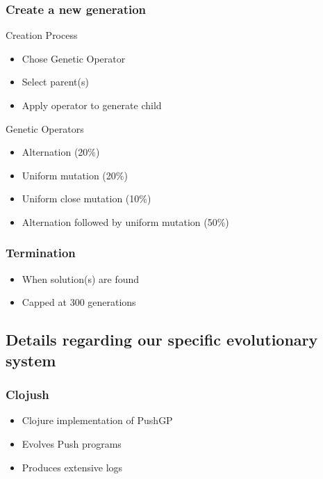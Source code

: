 \documentclass{beamer}
\begin{document}
   \begin{frame}
     \frametitle{Create a new generation}
     Creation Process
     \begin{itemize}
       \item Chose Genetic Operator 
       \item Select parent(s) 
       \item Apply operator to generate child
     \end{itemize}
     Genetic Operators
     \begin{itemize}
     \item Alternation (20\%)
     \item Uniform mutation (20\%)
     \item Uniform close mutation (10\%)
     \item Alternation followed by uniform mutation (50\%)
     \end{itemize} 
   \end{frame}

   \begin{frame}
    \frametitle{Termination} 
    \begin{itemize}
    \item When solution(s) are found
    \item Capped at 300 generations 
    \end{itemize}
   \end{frame}

   \subsection{Details regarding our specific evolutionary system}

   \begin{frame}
     \frametitle{Clojush}
     \begin{itemize}
     \item Clojure implementation of PushGP 
     \item Evolves Push programs
     \item Produces extensive logs
     \end{itemize}
   \end{frame}
\end{document}
